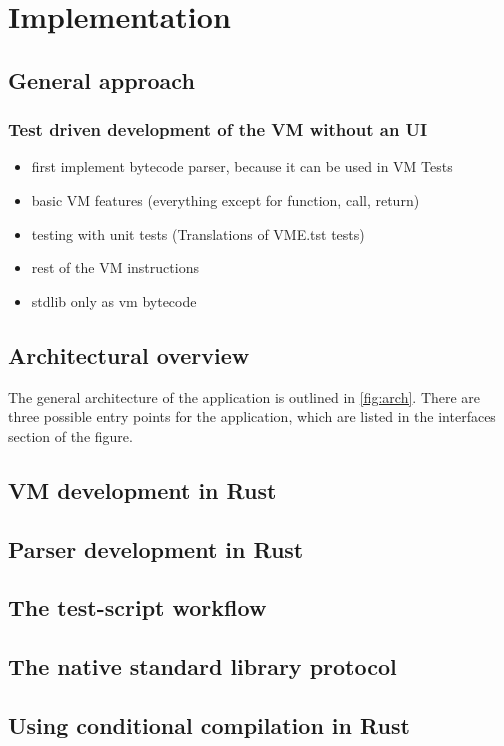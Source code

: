 \section{Implementation} \label{implementation}

\subsection{General approach}
\subsubsection{Test driven development of the VM without an UI}
\begin{itemize}
  \item first implement bytecode parser, because it can be used in VM Tests
  \item basic VM features (everything except for function, call, return)
  \item testing with unit tests (Translations of VME.tst tests)
  \item rest of the VM instructions
  \item stdlib only as vm bytecode
\end{itemize}

\subsection{Architectural overview}
The general architecture of the application is outlined in \cref{fig:arch}.
There are three possible entry points for the application, which are listed in the interfaces section of the figure.

\subsection{VM development in Rust}
\subsection{Parser development in Rust}
\subsection{The test-script workflow}
\subsection{The native standard library protocol}
\subsection{Using conditional compilation in Rust}
